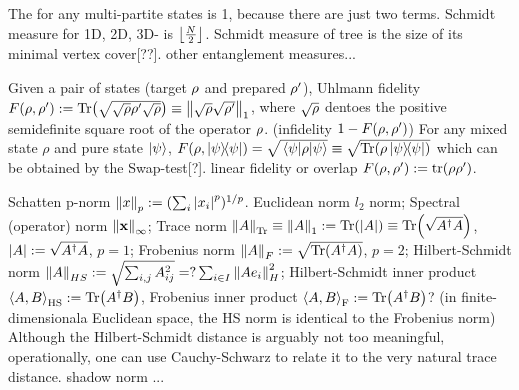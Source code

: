 \begin{example}
	The  for any multi-partite  states is 1, because there are just two terms.
	Schmidt measure for 1D, 2D, 3D- is $\left\lfloor \frac{N}{2} \right\rfloor$.
	Schmidt measure of tree is the size of its minimal vertex cover[??].
	other entanglement measures...
\end{example}

\begin{definition}[fidelity]\label{def:fidelity}
	Given a pair of states (target $\rho$ and prepared $\rho'$), 
	Uhlmann fidelity $F(\rho,\rho') : = \Tr(\sqrt{\sqrt{\rho}\rho'\sqrt{\rho}})\equiv\norm{\sqrt{\rho}\sqrt{\rho'}}_1$, where $\sqrt{\rho}$ dentoes the positive semidefinite square root of the operator $\rho$. (infidelity $1-F(\rho,\rho')$)
	For any mixed state $\rho$ and pure state $\ket{\psi}$, $F(\rho,\op{\psi})=\sqrt{\mel{\psi}{\rho}{\psi}}\equiv \sqrt{\Tr(\rho\op{\psi})}$ which can be obtained by the Swap-test[?].
	linear fidelity or overlap $F(\rho,\rho'):=\tr(\rho\rho')$.
\end{definition}
\begin{notation}[norm]\label{def:norm}
	Schatten p-norm $\norm{x}_p:= (\sum_i \abs{x_i}^p)^{1/p}$.
	Euclidean norm $l_2$ norm;
	Spectral (operator) norm $\norm{\vb{x}}_{\infty}$;
	Trace norm $\norm{A}_{\Tr}\equiv\norm{A}_{1}:=\Tr(\abs{A})\equiv\Tr(\sqrt{A^\dagger A})$, $\abs{A}:=\sqrt{A^\dagger A}$, $p=1$;
	Frobenius norm $\norm{A}_{F}:=\sqrt{\Tr(A^\dagger A)}$, $p=2$;
	Hilbert-Schmidt norm $\norm{A}_{HS}:=\sqrt{\sum_{i,j} A_{ij}^2 }=?\sum_{i\in I}\norm{Ae_i}_H^2$;
	Hilbert-Schmidt inner product $\expval{A,B}_{\textup{HS}}:=\Tr(A^\dagger B)$,
	Frobenius inner product $\expval{A,B}_{\textup{F}}:=\Tr(A^\dagger B)$?
	(in finite-dimensionala Euclidean space, the HS norm is identical to the Frobenius norm)
	Although the Hilbert-Schmidt distance is arguably not too meaningful, operationally, one can use Cauchy-Schwarz to relate it to the very natural trace distance. 
	shadow norm ...
\end{notation}
